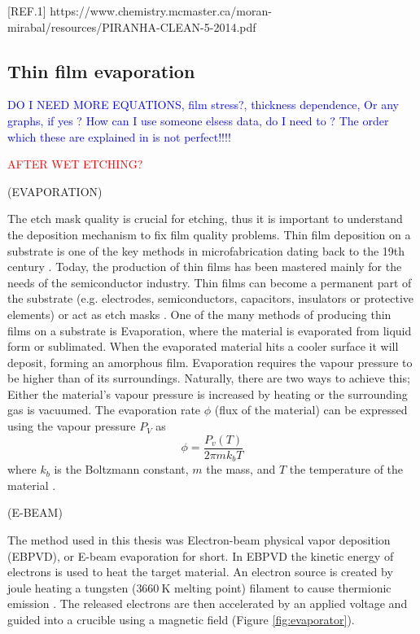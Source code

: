\documentclass[draft]{jyflluk}
\begin{document}
[REF.1] https://www.chemistry.mcmaster.ca/moran-mirabal/resources/PIRANHA-CLEAN-5-2014.pdf








\subsection{Thin film evaporation}
\label{sec:xx2}

\textcolor{blue}{DO I NEED MORE EQUATIONS, film stress?, thickness dependence, Or any graphs, if yes ? How can I use someone elsess data, do I need to ? The order which these are explained in is not perfect!!!!}

\textcolor{red}{AFTER WET ETCHING?}

(EVAPORATION)

The etch mask quality is crucial for etching, thus it is important to understand the deposition mechanism to fix film quality problems. Thin film deposition on a substrate is one of the key methods in microfabrication dating back to the 19th century \cite{ohring1992materials}.  Today, the production of thin films has been mastered mainly for the needs of the semiconductor industry. Thin films can become a permanent part of the substrate (e.g. electrodes, semiconductors, capacitors, insulators or protective elements) or act as etch masks \cite{franssila2010introduction}. One of the many methods of producing thin films on a substrate is Evaporation, where the material is evaporated from liquid form or sublimated. When the evaporated material hits a cooler surface it will deposit, forming an amorphous film. Evaporation requires the vapour pressure to be higher than of its surroundings. Naturally, there are two ways to achieve this; Either the material’s vapour pressure is increased by heating or the surrounding gas is vacuumed. The evaporation rate $\phi$ (flux of the material) can be expressed using the vapour pressure $P_V$ as 
%
\begin{equation}
    \label{eq:fluxx}
    \phi = \frac{P_v (T)}{2 \pi m k_b T}
 \end{equation}
where $k_b$ is the Boltzmann constant, $m$ the mass, and $T$ the temperature of the material \cite{franssila2010introduction}.

(E-BEAM)

The method used in this thesis was Electron-beam physical vapor deposition (EBPVD), or E-beam evaporation for short. In EBPVD the kinetic energy of electrons is used to heat the target material. An electron source is created by joule heating a tungsten ($\SI{3660}{\kelvin}$ melting point) filament to cause thermionic emission \cite{franssila2010introduction}. The released electrons are then accelerated by an applied voltage and guided into a crucible using a magnetic field (Figure \ref{fig:evaporator}). 
\end{document}
